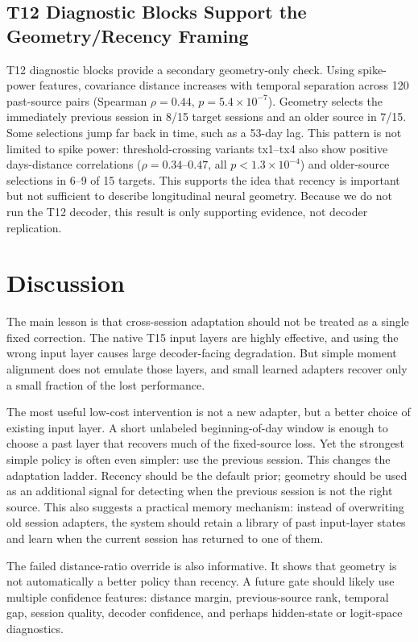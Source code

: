 \documentclass[10pt]{article}
\begin{document}
\subsection{T12 Diagnostic Blocks Support the Geometry/Recency Framing}
T12 diagnostic blocks provide a secondary geometry-only check. Using spike-power
features, covariance distance increases with temporal separation across 120
past-source pairs (Spearman $\rho=0.44$, $p=5.4\times10^{-7}$). Geometry selects
the immediately previous session in 8/15 target sessions and an older source in
7/15. Some selections jump far back in time, such as a 53-day lag. This pattern
is not limited to spike power: threshold-crossing variants tx1--tx4 also show
positive days-distance correlations ($\rho=0.34$--$0.47$, all $p<1.3\times
10^{-4}$) and older-source selections in 6--9 of 15 targets. This supports the
idea that recency is important but not sufficient to describe longitudinal neural
geometry. Because we do not run the T12 decoder, this result is only supporting
evidence, not decoder replication.

\section{Discussion}
The main lesson is that cross-session adaptation should not be treated as a
single fixed correction. The native T15 input layers are highly effective, and
using the wrong input layer causes large decoder-facing degradation. But simple
moment alignment does not emulate those layers, and small learned adapters
recover only a small fraction of the lost performance.

The most useful low-cost intervention is not a new adapter, but a better choice
of existing input layer. A short unlabeled beginning-of-day window is enough to
choose a past layer that recovers much of the fixed-source loss. Yet the
strongest simple policy is often even simpler: use the previous session. This
changes the adaptation ladder. Recency should be the default prior; geometry
should be used as an additional signal for detecting when the previous session is
not the right source.
This also suggests a practical memory mechanism: instead of overwriting old
session adapters, the system should retain a library of past input-layer states
and learn when the current session has returned to one of them.

The failed distance-ratio override is also informative. It shows that geometry is
not automatically a better policy than recency. A future gate should likely use
multiple confidence features: distance margin, previous-source rank, temporal
gap, session quality, decoder confidence, and perhaps hidden-state or logit-space
diagnostics.
\end{document}
